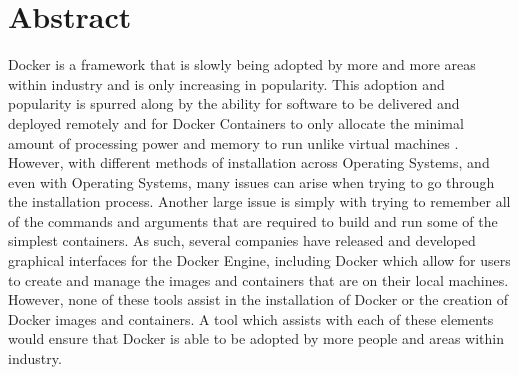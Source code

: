 \chapter*{Abstract}

Docker is a framework that is slowly being adopted by more and more areas within
industry and is only increasing in popularity. This adoption and popularity is
spurred along by the ability for software to be delivered and deployed remotely
and for Docker Containers to only allocate the minimal amount of processing
power and memory to run unlike virtual machines \cite{dockerDocs}. However, with
different methods of installation across Operating Systems, and even with
Operating Systems, many issues can arise when trying to go through the
installation process. Another large issue is simply with trying to remember all
of the commands and arguments that are required to build and run some of the
simplest containers. As such, several companies have released and developed
graphical interfaces for the Docker Engine, including Docker which allow for
users to create and manage the images and containers that are on their local
machines. However, none of these tools assist in the installation of Docker or
the creation of Docker images and containers. A tool which assists with each of
these elements would ensure that Docker is able to be adopted by more people and
areas within industry.
